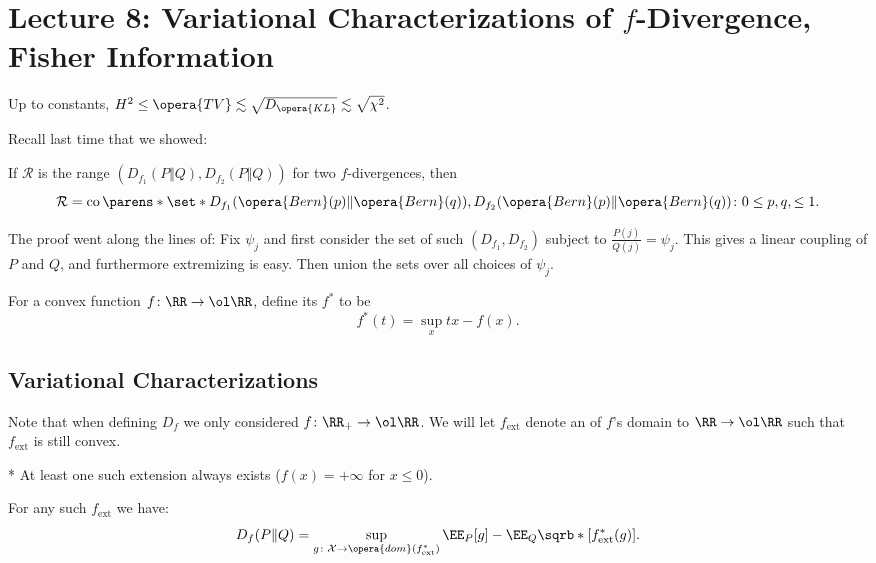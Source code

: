 \section*{Lecture 8: Variational Characterizations of $f$-Divergence, Fisher Information}
\setcounter{section}{8}

\begin{fact}
	Up to constants, $H^2 \leq \opera{TV} \lesssim \sqrt{D_{\opera{KL}}} \lesssim \sqrt{\chi^2}$.
\end{fact}

Recall last time that we showed:

\begin{thm}
	If $\mathcal R$ is the range $(D_{f_1}(P\Vert Q), D_{f_2}(P\Vert Q))$ for two $f$-divergences, then \[
		\mathcal R = \operatorname{co} \parens*{\set*{D_{f_1}(\opera{Bern}(p)\Vert \opera{Bern}(q)), D_{f_2} (\opera{Bern}(p) \Vert \opera{Bern}(q))\colon 0\leq p, q, \leq 1}}.
	\]
\end{thm}

The proof went along the lines of: Fix $\psi_j$ and first consider the set of such $(D_{f_1}, D_{f_2})$ subject to $\frac{P(j)}{Q(j)} = \psi_j$. This gives a linear coupling of $P$ and $Q$, and furthermore extremizing is easy.
Then union the sets over all choices of $\psi_j$.

\begin{defn}
	For a convex function $f\colon \RR\to \ol \RR$, define its  $f^*$ to be \[
		f^*(t) = \sup_x tx - f(x).
	\]
\end{defn}

\subsection{Variational Characterizations}

Note that when defining $D_f$ we only considered $f\colon \RR_+ \to \ol \RR$. We will let $f_{\text{ext}}$ denote an  of $f$'s domain to $\RR \to \ol \RR$ such that $f_{\text{ext}}$ is still convex.

\begin{fact}*
	At least one such extension always exists ($f(x) = +\infty$ for $x \leq 0$).
\end{fact}

\begin{thm}
	For any such $f_{\text{ext}}$ we have: \[
		D_f(P\Vert Q) = \sup_{g\colon \mathcal X\to \opera{dom}(f_{\textnormal{ext}}^*)} \EE_P[g] - \EE_Q \sqrb*[f_{\textnormal{ext}}^*(g)].
	\]
\end{thm}

